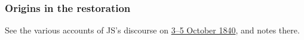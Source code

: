 	
		
	\subsubsection{Origins in the restoration}
		\label{BAPTISMDEAD-origins}
		
		See the various accounts of JS's discourse on \hyperref[EMS-1840-JS-3-5-OCT-1840]{3--5 October 1840}, and notes there.